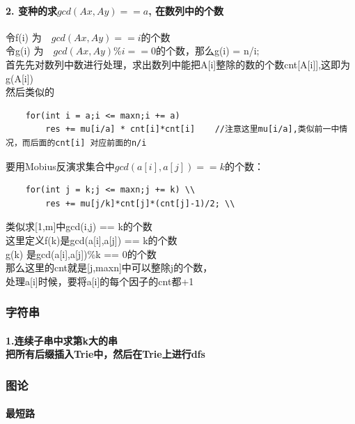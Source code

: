 \documentclass{article}
\begin{document}
\paragraph{2. 变种的求$gcd(Ax,Ay) == a$, 在数列中的个数\\}
	令f(i) 为　$gcd(Ax,Ay) == i$的个数 \\
令g(i) 为　$gcd(Ax,Ay) \% i == 0$的个数，那么g(i) = n/i; \\
首先先对数列中数进行处理，求出数列中能把A[i]整除的数的个数cnt[A[i]],这即为g(A[i]) \\
然后类似的 \\ 
\begin{lstlisting}
	for(int i = a;i <= maxn;i += a) 
		res += mu[i/a] * cnt[i]*cnt[i]    //注意这里mu[i/a],类似前一中情况，而后面的cnt[i] 对应前面的n/i
\end{lstlisting} 
要用Mobius反演求集合中$gcd(a[i],a[j]) == k$的个数： \\
\begin{lstlisting}
    for(int j = k;j <= maxn;j += k) \\
        res += mu[j/k]*cnt[j]*(cnt[j]-1)/2; \\
\end{lstlisting} 
类似求[1,m]中gcd(i,j) == k的个数 \\
这里定义f(k)是gcd(a[i],a[j]) == k的个数 \\
g(k) 是gcd(a[i],a[j])\%k == 0的个数 \\
那么这里的cnt就是[j,maxn]中可以整除j的个数， \\
处理a[i]时候，要将a[i]的每个因子的cnt都+1 

\subsubsection{字符串}
\paragraph{1.连续子串中求第k大的串\\ 把所有后缀插入Trie中，然后在Trie上进行dfs}

\subsubsection{图论}
\paragraph{最短路}
\end{document}
